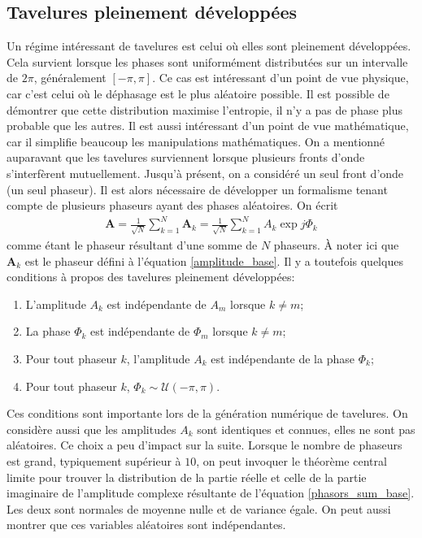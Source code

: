 \documentclass[11pt]{article} %
\begin{document}
\subsection{Tavelures pleinement développées}
Un régime intéressant de tavelures est celui où elles sont pleinement développées. Cela survient lorsque les phases sont uniformément distributées sur un intervalle de $2\pi$, généralement $[-\pi, \pi]$. Ce cas est intéressant d'un point de vue physique, car c'est celui où le déphasage est le plus aléatoire possible. Il est possible de démontrer que cette distribution maximise l'entropie, il n'y a pas de phase plus probable que les autres. Il est aussi intéressant d'un point de vue mathématique, car il simplifie beaucoup les manipulations mathématiques. On a mentionné auparavant que les tavelures surviennent lorsque plusieurs fronts d'onde s'interfèrent mutuellement. Jusqu'à présent, on a considéré un seul front d'onde (un seul phaseur). Il est alors nécessaire de développer un formalisme tenant compte de plusieurs phaseurs ayant des phases aléatoires. On écrit
\begin{align}
\textbf{A} = \frac{1}{\sqrt{N}}\sum_{k=1}^N\textbf{A}_k = \frac{1}{\sqrt{N}}\sum_{k=1}^NA_k\exp{j\Phi_k}\label{phasors_sum_base}
\end{align}
comme étant le phaseur résultant d'une somme de $N$ phaseurs. À noter ici que $\textbf{A}_k$ est le phaseur défini à l'équation \eqref{amplitude_base}. Il y a toutefois quelques conditions à propos des tavelures pleinement développées:
\begin{enumerate}
\item L'amplitude $A_k$ est indépendante de $A_m$ lorsque $k\neq m$;
\item La phase $\Phi_k$ est indépendante de $\Phi_m$ lorsque $k\neq m$;
\item Pour tout phaseur $k$, l'amplitude $A_k$ est indépendante de la phase $\Phi_k$;
\item Pour tout phaseur $k$, $\Phi_k\sim\mathcal{U}(-\pi, \pi)$.
\end{enumerate}
Ces conditions sont importante lors de la génération numérique de tavelures. On considère aussi que les amplitudes $A_k$ sont identiques et connues, elles ne sont pas aléatoires. Ce choix a peu d'impact sur la suite. Lorsque le nombre de phaseurs est grand, typiquement supérieur à $10$, on peut invoquer le théorème central limite pour trouver la distribution de la partie réelle et celle de la partie imaginaire de l'amplitude complexe résultante de l'équation \eqref{phasors_sum_base}. Les deux sont normales de moyenne nulle et de variance égale. On peut aussi montrer que ces variables aléatoires sont indépendantes.
\end{document}
